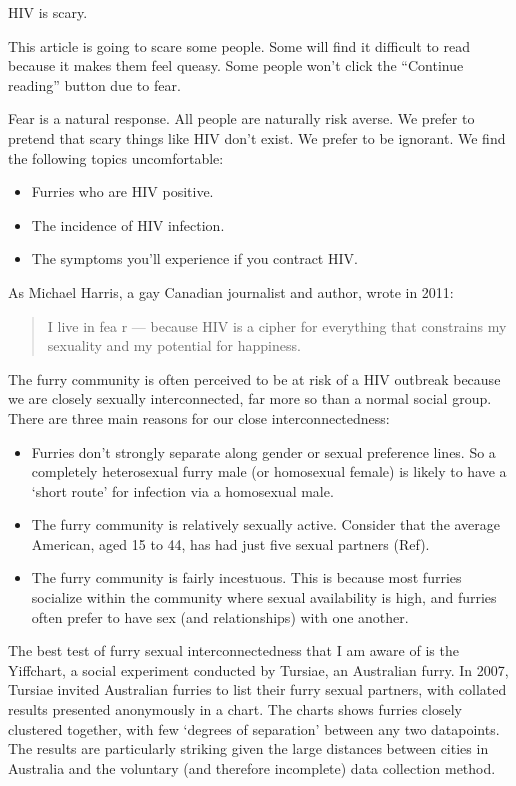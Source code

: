 
HIV is scary.

This article is going to scare some people. Some will find it difficult to read because it makes them feel queasy. Some people won't click the ``Continue reading'' button due to fear.

Fear is a natural response. All people are naturally risk averse. We prefer to pretend that scary things like HIV don't exist. We prefer to be ignorant. We find the following topics uncomfortable:

\begin{itemize}
  \item Furries who are HIV positive.
  \item The incidence of HIV infection.
  \item The symptoms you'll experience if you contract HIV.
\end{itemize}

As Michael Harris, a gay Canadian journalist and author, wrote in 2011:

\begin{quote}
  I live in fea r — because HIV is a cipher for everything that constrains my sexuality and my potential for happiness.
\end{quote}

The furry community is often perceived to be at risk of a HIV outbreak because we are closely sexually interconnected, far more so than a normal social group. There are three main reasons for our close interconnectedness:

\begin{itemize}
  \item Furries don't strongly separate along gender or sexual preference lines. So a completely heterosexual furry male (or homosexual female) is likely to have a ‘short route' for infection via a homosexual male.
  \item The furry community is relatively sexually active. Consider that the average American, aged 15 to 44, has had just five sexual partners (Ref).
  \item The furry community is fairly incestuous. This is because most furries socialize within the community where sexual availability is high, and furries often prefer to have sex (and relationships) with one another.
\end{itemize}

The best test of furry sexual interconnectedness that I am aware of is the Yiffchart, a social experiment conducted by Tursiae, an Australian furry. In 2007, Tursiae invited Australian furries to list their furry sexual partners, with collated results presented anonymously in a chart. The charts shows furries closely clustered together, with few ‘degrees of separation' between any two datapoints. The results are particularly striking given the large distances between cities in Australia and the voluntary (and therefore incomplete) data collection method.

